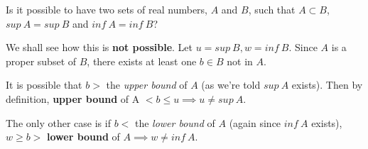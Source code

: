 \documentclass[boxes, qed]{homework}
\begin{document}
\newenvironment{amatrix}[1]{%
  \left[\begin{array}{@{}*{#1}{c}|c@{}}
}{%
  \end{array}\right]
}

\newenvironment{augmatrix}[1]{%
  \left[\begin{array}{#1}
}{%
  \end{array}\right]
}

\begin{problem}Is it possible to have two sets of real numbers, $A$ and $B$, such that
  $A \subset B$, $sup\ {A} = sup\ {B}$ and $inf\ {A} = inf\ {B}$?
\end{problem}
\begin{solution}We shall see how this is \textbf{not possible}.
  Let $u = sup \ {B}, w = inf\ {B}$. 
  Since $A$ is a proper subset of $B$,
  there exists at least one $b\in{B}$ not in $A$.

  It is possible that $b>$ the \textit{upper bound} of $A$
  (as we're told $sup\ A$ exists). Then by definition,
  \textbf{upper bound} of A $ < b \le u \implies u \ne sup\ A$.
  
  The only other case is if $b<$ the \textit{lower bound} of $A$
  (again since $inf\ A$ exists), 
  $w \ge b > $ \textbf{lower bound} of $A \implies w \ne inf\ A$.
\end{solution}
\end{document}
